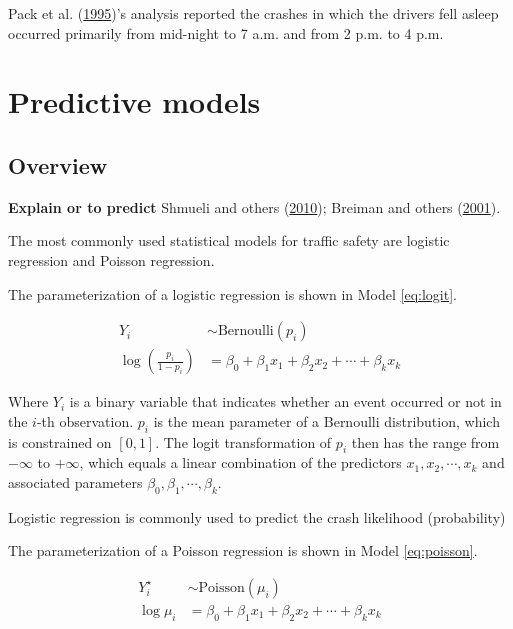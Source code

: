 \documentclass[12pt]{book}
\numberwithin{equation}{chapter}
\begin{document}
Pack et al. (\protect\hyperlink{ref-pack1995characteristics}{1995})'s analysis reported the crashes in which the drivers fell asleep occurred primarily from mid-night to 7 a.m. and from 2 p.m. to 4 p.m.

\hypertarget{predictive-models}{%
\section{Predictive models}\label{predictive-models}}

\hypertarget{overview}{%
\subsection{Overview}\label{overview}}

\textbf{Explain or to predict} Shmueli and others (\protect\hyperlink{ref-shmueli2010explain}{2010}); Breiman and others (\protect\hyperlink{ref-breiman2001statistical}{2001}).

The most commonly used statistical models for traffic safety are logistic regression and Poisson regression.

The parameterization of a logistic regression is shown in Model \eqref{eq:logit}.

\begin{equation}
\begin{split}
Y_i & \sim \text{Bernoulli}(p_i) \\
\log(\frac{p_i}{1 - p_i}) & = \beta_0 + \beta_1x_1 + \beta_2x_2 + \cdots + \beta_kx_k
\label{eq:logit}
\end{split}
\end{equation}

Where \(Y_i\) is a binary variable that indicates whether an event occurred or not in the \(i\)-th observation. \(p_i\) is the mean parameter of a Bernoulli distribution, which is constrained on \([0, 1]\). The logit transformation of \(p_i\) then has the range from \(-\infty\) to \(+\infty\), which equals a linear combination of the predictors \(x_1, x_2, \cdots, x_k\) and associated parameters \(\beta_0, \beta_1, \cdots, \beta_k\).

Logistic regression is commonly used to predict the crash likelihood (probability)

The parameterization of a Poisson regression is shown in Model \eqref{eq:poisson}.

\begin{equation}
\begin{split}
Y_i^\star & \sim \text{Poisson}(\mu_i) \\
\log\mu_i & = \beta_0 + \beta_1x_1 + \beta_2x_2 + \cdots + \beta_kx_k
\label{eq:poisson}
\end{split}
\end{equation}
\end{document}
